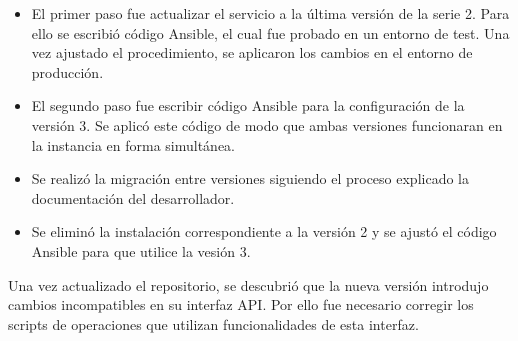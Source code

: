 \begin{itemize}
\item El primer paso fue actualizar el servicio a la última versión de
  la serie 2. Para ello se escribió código Ansible, el cual fue
  probado en un entorno de test. Una vez ajustado el procedimiento, se
  aplicaron los cambios en el entorno de producción.
\item El segundo paso fue escribir código Ansible para la
  configuración de la versión 3. Se aplicó este código de modo que
  ambas versiones funcionaran en la instancia en forma simultánea.
\item Se realizó la migración entre versiones siguiendo el proceso
  explicado la documentación del desarrollador.
\item Se eliminó la instalación correspondiente a la versión 2 y se
  ajustó el código Ansible para que utilice la vesión 3.
\end{itemize}
Una vez actualizado el repositorio, se descubrió que la nueva versión
introdujo cambios incompatibles en su interfaz API. Por ello fue
necesario corregir los scripts de operaciones que utilizan
funcionalidades de esta interfaz.

